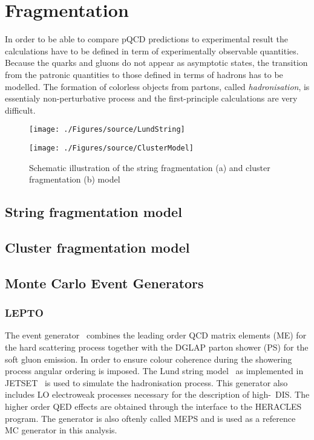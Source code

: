 \section{Fragmentation }
In order to be able to compare pQCD predictions to experimental result the calculations have to be defined in term of experimentally observable quantities. Because the quarks and gluons do not appear as asymptotic states, the transition from the patronic quantities to those defined in terms of hadrons has to be modelled. The formation of colorless objects from partons, called \emph{hadronisation}, is essentialy non-perturbative process and the first-principle calculations are very difficult. 
\begin{figure}[t]
	\centering
	\begin{subfloat}[]{
		\texttt{[image: ./Figures/source/LundString]}
		\label{fig:lund}
	 }%
	\end{subfloat}
	\begin{subfloat}[]{
		\texttt{[image: ./Figures/source/ClusterModel]}
		\label{fig:cluster}
	}%
	\end{subfloat}
	\caption{Schematic illustration of the string fragmentation (a) and cluster fragmentation (b) model}
\label{fig:fragmentationmodels}
\end{figure}
\subsection{String fragmentation model}
\subsection{Cluster fragmentation model}
\subsection{Monte Carlo Event Generators}
\subsubsection{LEPTO}
The \lepto event generator~\cite{lepto} combines the leading order QCD matrix elements (ME) for the hard scattering process together with the DGLAP parton shower (PS) for the soft gluon emission. In order to ensure colour coherence during the showering process angular ordering is imposed. The Lund string model~\cite{lund} as implemented in JETSET~\cite{jetset} is used to simulate the hadronisation process. This generator also includes LO electroweak processes necessary for the description of high-\qsq~DIS. The higher order QED effects are obtained through the interface to the HERACLES~\cite{heracles} program. The \lepto generator is also oftenly called MEPS and is used as a reference MC generator in this analysis.
